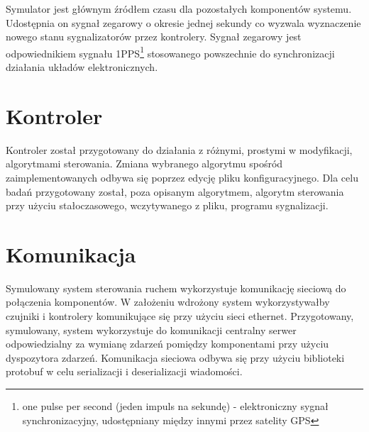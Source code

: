 Symulator jest głównym źródłem czasu dla pozostałych komponentów systemu. Udostępnia on sygnał zegarowy o okresie jednej sekundy co wyzwala wyznaczenie nowego stanu sygnalizatorów przez kontrolery. Sygnał zegarowy jest odpowiednikiem sygnału 1PPS\footnote{one pulse per second (jeden impuls na sekundę) - elektroniczny sygnał synchronizacyjny, udostępniany między innymi przez satelity GPS} stosowanego powszechnie do synchronizacji działania układów elektronicznych.

\section{Kontroler}
\label{chap:kontroler}
Kontroler został przygotowany do działania z różnymi, prostymi w modyfikacji, algorytmami sterowania. Zmiana wybranego algorytmu spośród zaimplementowanych odbywa się poprzez edycję pliku konfiguracyjnego. Dla celu badań przygotowany został, poza opisanym algorytmem, algorytm sterowania przy użyciu stałoczasowego, wczytywanego z pliku, programu sygnalizacji.

\section{Komunikacja}
\label{chap:komunikacja}
Symulowany system sterowania ruchem wykorzystuje komunikację sieciową do połączenia komponentów. W założeniu wdrożony system wykorzystywałby czujniki i kontrolery komunikujące się przy użyciu sieci ethernet. Przygotowany, symulowany, system wykorzystuje do komunikacji centralny serwer odpowiedzialny za wymianę zdarzeń pomiędzy komponentami przy użyciu dyspozytora zdarzeń. Komunikacja sieciowa odbywa się przy użyciu biblioteki protobuf \cite{protobuf} w celu serializacji i deserializacji wiadomości.